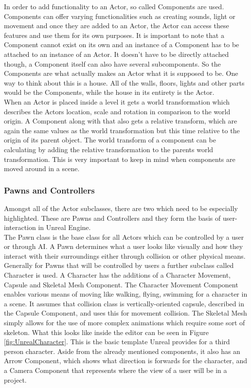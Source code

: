 In order to add functionality to an Actor, so called Components are used. Components can offer varying functionalities such as creating sounds, light or movement and once they are added to an Actor, the Actor can access these features and use them for its own purposes. It is important to note that a Component cannot exist on its own and an instance of a Component has to be attached to an instance of an Actor. It doesn't have to be directly attached though, a Component itself can also have several subcomponents. So the Components are what actually makes an Actor what it is supposed to be. One way to think about this is a house. All of the walls, floors, lights and other parts would be the Components, while the house in its entirety  is the Actor.\\

When an Actor is placed inside a level it gets a world transformation which describes the Actors location, scale and rotation in comparison to the world origin. A Component along with that also gets a relative transform, which are again the same values as the world transformation but this time relative to  the origin of its parent object. The world transform of a component can be calculating by adding the relative transformation to the parents world transformation. This is very important to keep in mind when components are moved around in a scene. 

\subsubsection{Pawns and Controllers}
Amongst all of the Actor subclasses, there are two which need to be especially highlighted. These are Pawns and Controllers and they form the basis of user-interaction in Unreal Engine.\\
The Pawn class is the base class for all Actors which can be controlled by a user or through AI. A Pawn determines what a user looks like visually and how they interact with their surroundings either through collision or other physical means. Generally for Pawns that will be controlled by users a further subclass called Character is used. A Character has the additions of a Character Movement, Capsule and Skeletal Mesh Component. The Character Movement Component enables various means of moving like walking, flying, swimming for a character in a scene. It assumes that collision class is vertically-oriented capsule, described in the Capsule Component, and uses this for movement collision. The Skeletal Mesh simply allows for the use of more complex animations which require some sort of skeleton. What this looks like inside the editor can be seen in Figure \ref{fig:UnrealCharacter}. This is the basic template Unreal provides for a third person character. Aside from the already mentioned components, it also has an Arrow Component, which shows what direction is forwards for the character, and a Camera Component that represents where the view of a user will be in a project.\\

